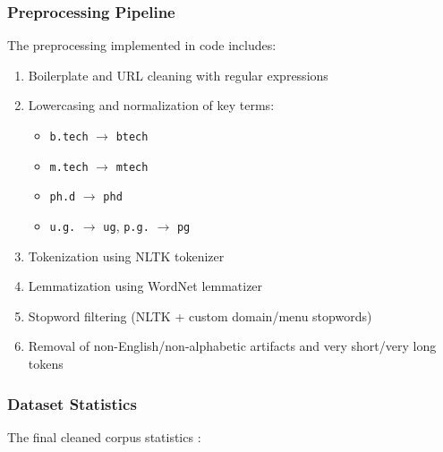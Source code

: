 \documentclass[11pt,a4paper]{article}
\begin{document}
\subsubsection{Preprocessing Pipeline}
The preprocessing implemented in code includes:
\begin{enumerate}[leftmargin=1.5em]
    \item Boilerplate and URL cleaning with regular expressions
    \item Lowercasing and normalization of key terms:
    \begin{itemize}[leftmargin=1.5em]
        \item \texttt{b.tech} $\rightarrow$ \texttt{btech}
        \item \texttt{m.tech} $\rightarrow$ \texttt{mtech}
        \item \texttt{ph.d} $\rightarrow$ \texttt{phd}
        \item \texttt{u.g.} $\rightarrow$ \texttt{ug}, \texttt{p.g.} $\rightarrow$ \texttt{pg}
    \end{itemize}
    \item Tokenization using NLTK tokenizer
    \item Lemmatization using WordNet lemmatizer
    \item Stopword filtering (NLTK + custom domain/menu stopwords)
    \item Removal of non-English/non-alphabetic artifacts and very short/very long tokens
\end{enumerate}

\subsubsection{Dataset Statistics}
The final cleaned corpus statistics :
\end{document}
